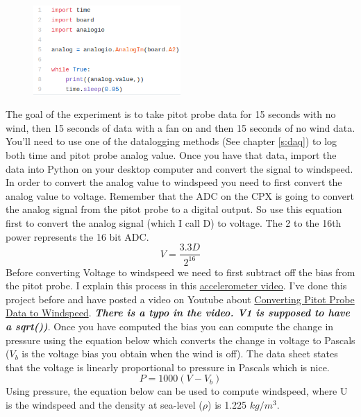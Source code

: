 \begin{figure}[H]
  \begin{center}
    \includegraphics[width=0.5\textwidth]{Figures/analogio.png}
  \end{center}
\end{figure}
The goal of the experiment is to take pitot probe data for 15 seconds with no wind, then 15 seconds of data with a fan on and then 15 seconds of no wind data. You’ll need to use one of the datalogging methods (See chapter \ref{s:daq}) to log both time and pitot probe analog value. Once you have that data, import the data into Python on your desktop computer and convert the signal to windspeed. In order to convert the analog value to windspeed you need to first convert the analog value to voltage. Remember that the ADC on the CPX is going to convert the analog signal from the pitot probe to a digital output. So use this equation first to convert the analog signal (which I call D) to voltage. The 2 to the 16th power represents the 16 bit ADC.
\begin{equation}
V = \frac{3.3D}{2^{16}}
\end{equation}
Before converting Voltage to windspeed we need to first subtract off the bias from the pitot probe. I explain this process in this \href{https://www.youtube.com/watch?v=e4xs9Ky7_YI&feature=youtu.be}{accelerometer video}. I’ve done this project before and have posted a video on Youtube about \href{https://youtu.be/jSLIRC1cfvE}{Converting Pitot Probe Data to Windspeed}. {\bf \it There is a typo in the video. V1 is supposed to have a sqrt())}. Once you have computed the bias you can compute the change in pressure using the equation below which converts the change in voltage to Pascals ($V_b$ is the voltage bias you obtain when the wind is off). The data sheet states that the voltage is linearly proportional to pressure in Pascals which is nice.
\begin{equation}
P = 1000(V-V_b)
\end{equation}
Using pressure, the equation below can be used to compute windspeed, where U is the windspeed and the density at sea-level ($\rho$) is 1.225 $kg/m^3$.
